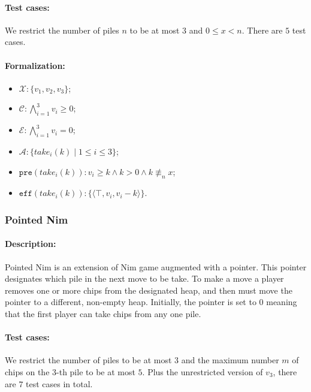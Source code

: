 \documentclass[review]{elsarticle}
\newcommand{\set}[1]{\{ #1 \}}
\newcommand{\tuple}[1]{\langle {#1} \rangle}
\newcommand{\true}{\top}
\newcommand{\statevar}{\mathcal{X}}
\newcommand{\act}{\mathcal{A}}
\newcommand{\constraint}{\mathcal{C}}
\newcommand{\estate}{\mathcal{E}}
\newcommand{\pre}{\mathtt{pre}}
\newcommand{\eff}{\mathtt{eff}}
\newcommand{\nmodulo}{\not \equiv}
\begin{document}
\paragraph{Test cases:}
We restrict the number of piles $n$ to be at most $3$ and $0\le x <n$.
There are $5$ test cases.
\paragraph{Formalization:}
\begin{itemize}
	\item $\statevar: \set{v_1, v_2, v_3}$;
	\item $\constraint: \bigwedge_{i=1}^{3} v_i \ge 0$;
	\item $\estate: \bigwedge_{i=1}^{3} v_i = 0$;
	\item $\act:\set{take_i(k){\mid}1 \le i\le 3}$;
	\item $\pre(take_i(k)) : v_i \ge k \wedge k > 0 \wedge k \nmodulo_n x$;
	\item $\eff(take_i(k)) : \set{\tuple{\true,v_i,v_i -k}}$.
\end{itemize}

\subsubsection{Pointed Nim \protect\cite{AlbN2004}}

\paragraph{Description:}
Pointed Nim is an extension of Nim game augmented with a pointer. %
This pointer designates which pile in the next move to be take. 
To make a move a player removes one or more chips from the designated heap, and then must move the pointer to a different, non-empty heap. 
Initially, the pointer is set to $0$ meaning that the first player can take chips from any one pile.
\paragraph{Test cases:}
We restrict the number of piles to be at most $3$ and the maximum number $m$ of chips on the $3$-th pile to be at most $5$. 
Plus the unrestricted version of $v_3$, there are $7$ test cases in total.
\end{document}
